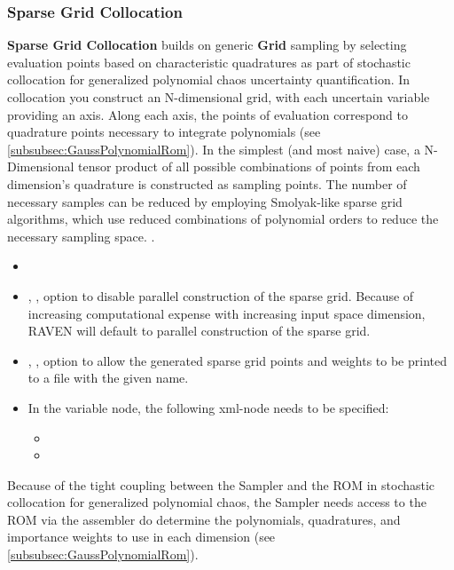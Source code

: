 \subsubsection{Sparse Grid Collocation}
\label{subsubsubsec:SparseGridCollocation}
\textbf{Sparse Grid Collocation} builds on generic \textbf{Grid} sampling by selecting evaluation points based on characteristic quadratures as part of
stochastic collocation for generalized polynomial chaos uncertainty quantification.  In collocation you construct an N-dimensional grid, with each uncertain
variable providing an axis.  Along each axis, the points of evaluation correspond to quadrature points necessary to integrate polynomials
(see \ref{subsubsec:GaussPolynomialRom}).  In the simplest (and most  naive) case, a N-Dimensional tensor product of all possible combinations of points from
each dimension's quadrature is constructed as sampling points.  The number of necessary samples can be reduced by employing Smolyak-like sparse grid algorithms,
which use reduced combinations of polynomial orders to reduce the necessary sampling space.  .

\begin{itemize}
\itemsep0em
\item \nameDescription
\item {}, , option to disable parallel construction of the sparse grid.  Because of increasing computational expense with increasing input space dimension, RAVEN will default to parallel construction of the sparse grid. %
\item {}, , option to allow the generated sparse grid points and weights to be printed to a file with the given name.
\end{itemize}
\begin{itemize}
\item \variableDescription
 In the variable node, the following xml-node needs to be specified:
 \begin{itemize}
    \item \distributionDescription
    \item \functionDescription
 \end{itemize} \end{itemize}
Because of the tight coupling between the Sampler and the ROM in stochastic collocation for generalized polynomial chaos, the Sampler needs access to the ROM via the assembler do determine the polynomials, quadratures, and importance weights to use in each dimension (see \ref{subsubsec:GaussPolynomialRom}).

